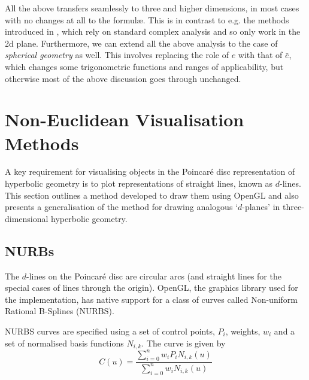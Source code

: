 All the above transfers seamlessly to three and higher dimensions, in
most cases with no changes at all to the formul\ae. This is in
contrast to e.g. the methods introduced in \cite{GEOM:Brannan}, which
rely on standard complex analysis and so only work in the 2d
plane. Furthermore, we can extend all the above analysis to the
case of \textit{spherical geometry} as well. This involves
replacing the role of $e$ with that of $\bar{e}$, which changes
some trigonometric functions and ranges of applicability, but
otherwise most of the above discussion goes through unchanged.


\section{Non-Euclidean Visualisation Methods}
\label{sec:noneuclid-vis}

A key requirement for visualising objects in the Poincar\'e disc
representation of hyperbolic geometry is to plot representations of
straight lines, known as $d$-lines. This section outlines a method 
developed to draw them using OpenGL and also presents a generalisation
of the method for drawing analogous `$d$-planes' in three-dimensional
hyperbolic geometry.

\subsection{NURBs}

The $d$-lines on the Poincar\'e disc are circular arcs (and straight lines
for the special cases of lines through the origin). OpenGL, the graphics
library used for the implementation, has native support for a class
of curves called Non-uniform Rational B-Splines (NURBS)\cite{mecg}. 


NURBS curves are specified using a set of control points, $P_i$,
weights, $w_i$ and a set of normalised basis functions $N_{i,k}$.
The curve is given by
\[
C(u) = \frac{\sum_{i=0}^n w_i P_i N_{i,k}(u)}{\sum_{i=0}^n w_i N_{i,k}(u)}
\]

